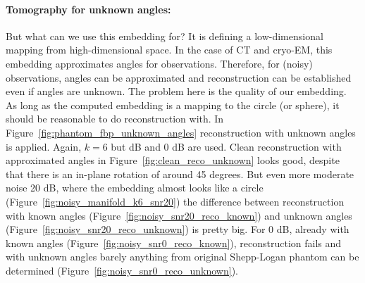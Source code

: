 \paragraph{Tomography for unknown angles:}
But what can we use this embedding for?
It is defining a low-dimensional mapping from high-dimensional space.
In the case of CT and cryo-EM, this embedding approximates angles for observations.
Therefore, for (noisy) observations, angles can be approximated and reconstruction can be established even if angles are unknown.
The problem here is the quality of our embedding. As long as the computed embedding is a mapping to the circle (or sphere),
it should be reasonable to do reconstruction with.
In Figure~\ref{fig:phantom_fbp_unknown_angles} reconstruction with unknown angles is applied. Again, $k=6$
but  dB and 0 dB are used. Clean reconstruction with approximated angles in Figure~\ref{fig:clean_reco_unknown} looks good, 
despite that there is an in-plane rotation of around 45 degrees. 
But even more moderate noise 20 dB, where the embedding almost looks like a circle (Figure~\ref{fig:noisy_manifold_k6_snr20})
the difference between reconstruction with known angles (Figure~\ref{fig:noisy_snr20_reco_known})
and unknown angles (Figure~\ref{fig:noisy_snr20_reco_unknown}) is pretty big.
For 0 dB, already with known angles (Figure~\ref{fig:noisy_snr0_reco_known}), reconstruction fails and with unknown angles barely anything from
original Shepp-Logan phantom can be determined  (Figure~\ref{fig:noisy_snr0_reco_unknown}).

